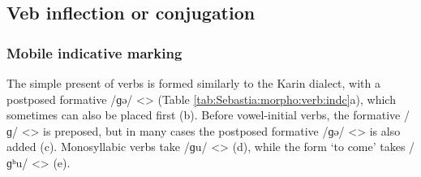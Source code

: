 \subsection{Veb inflection or conjugation}

\subsubsection{Mobile indicative marking}


The simple present of verbs is formed similarly to the Karin dialect, with a postposed formative /ɡə/ <> (Table \ref{tab:Sebastia:morpho:verb:indc}a), which sometimes can also be placed first (b). Before vowel-initial verbs, the formative /ɡ/ <> is preposed, but in many cases the postposed formative /ɡə/ <> is also added (c). Monosyllabic verbs take /ɡu/ <> (d), while the form `to come' takes /ɡʰu/ <> (e). 




